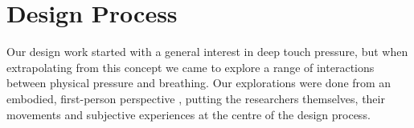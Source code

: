 

\section{Design Process}


Our design work started with a general interest in deep touch pressure, but when extrapolating from this concept we came to explore a range of interactions between physical pressure and breathing. Our explorations were done from an embodied, first-person perspective \cite{hook_embracing_2018}, putting the researchers themselves, their movements and subjective experiences at the centre of the design process.
 
